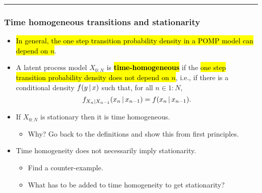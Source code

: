 \documentclass[]{article}
\providecommand{\tightlist}{%
  \setlength{\itemsep}{0pt}\setlength{\parskip}{0pt}}
\begin{document}
\begin{center}\rule{0.5\linewidth}{\linethickness}\end{center}

\subsubsection{Time homogeneous transitions and
stationarity}\label{time-homogeneous-transitions-and-stationarity}

\begin{itemize}
\item
  \hl{In general, the one step transition probability density in a POMP
  model can depend on $n$}.
\item
  A latent process model \(X_{0:N}\) is \hl{\textbf{time-homogeneous}} if the
  \hl{one step transition probability density does not depend on $n$},
  i.e., if there is a conditional density \(f(y{\, | \,} x)\) such that,
  for all \(n\in 1:N\),
  \[  f_{X_n|X_{n-1}}(x_n{\, | \,} x_{n-1})= f(x_n{\, | \,} x_{n-1}).\]
\item
  If \(X_{0:N}\) is stationary then it is time homogeneous.

  \begin{itemize}
  \tightlist
  \item
    Why? Go back to the definitions and show this from first principles.
  \end{itemize}

\item
  Time homogeneity does not necessarily imply stationarity.
  \begin{itemize}
  \item
    Find a counter-example.
  \item
    What has to be added to time homogeneity to get stationarity?
  \end{itemize}
\end{itemize}
\end{document}
